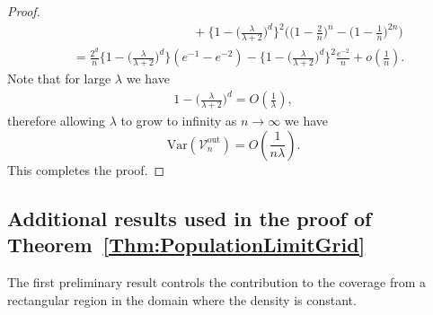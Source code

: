 \documentclass[11pt]{article}
\newcommand{\var}{\mathrm{Var}}
\begin{document}
\begin{proof}
\begin{align*}
    &\hspace{4cm}+ \biggl\{1 - \biggl(\frac{\lambda}{\lambda +2 }\biggr)^d\biggr\}^2\bigg(\big(1 - \frac{2}{n}\big)^n - \big(1 - \frac{1}{n}\big)^{2n}\bigg)\\
    &= \frac{2^d}{n} \biggl\{1 - \biggl(\frac{\lambda}{\lambda + 2 }\biggr)^d\biggr\}(e^{-1} - e^{-2}) -\biggl\{1 - \biggl(\frac{\lambda}{\lambda +2 }\biggr)^d\biggr\}^2 \frac{e^{-2}}{n} + o(\frac{1}{n}).
\end{align*}
Note that for large $\lambda$ we have
\begin{align*}
    1 - \biggl(\frac{\lambda}{\lambda + 2 }\biggr)^d = O(\frac{1}{\lambda}),
\end{align*}
therefore allowing $\lambda$ to grow to infinity as $n\rightarrow\infty$ we have
\[
\var(\mathcal{V}_n^{\mathrm{out}}) = O(\frac{1}{n\lambda}).
\]
This completes the proof. 
\end{proof}





\subsection{Additional results used in the proof of Theorem~\ref{Thm:PopulationLimitGrid}}

The first preliminary result controls the contribution to the coverage from a rectangular region in the domain where the density is constant.
\end{document}

